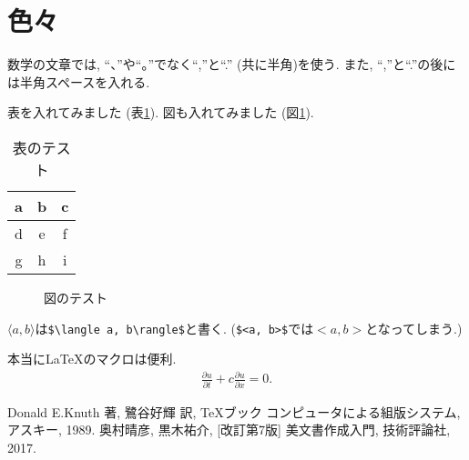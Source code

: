 \documentclass[a4paper, 12pt, dvipdfmx]{jsarticle}
\theoremstyle{definition}
\newcommand{\macrotest}{\LaTeX のマクロは便利}
\newcommand{\PD}[2]{\frac{\partial {#1}}{\partial {#2}}}%
\begin{document}
\section{色々}
数学の文章では, ``、''や``。''でなく``,''と``.'' (共に半角)を使う.
また, ``,''と``.''の後には半角スペースを入れる.

表を入れてみました (表\ref{tab:test}).
図も入れてみました (図\ref{fig:test}).

\begin{table}[h]
    \centering
    \caption{表のテスト}
    \label{tab:test}
    \begin{tabular}{|c||cc|}
        \hline
        a & b & c\\ \hline \hline
        d & e & f\\
        g & h & i\\ \hline 
    \end{tabular}
\end{table}

\begin{figure}[h]
    \centering
    \caption{図のテスト}
    \label{fig:test}
\end{figure}

$\langle a, b\rangle$は\verb|$\langle a, b\rangle$|と書く.
(\verb|$<a, b>$|では$<a, b>$となってしまう.)

本当に\macrotest.
\begin{align*}
    \PD{u}{t}+c\PD{u}{x}=0.
\end{align*}

\begin{thebibliography}{1}
     Donald E.Knuth 著, 鷺谷好輝 訳, \TeX ブック コンピュータによる組版システム, アスキー, 1989.
     奥村晴彦, 黒木祐介, [改訂第7版] \LaTeXe 美文書作成入門, 技術評論社, 2017.
\end{thebibliography}
\end{document}
